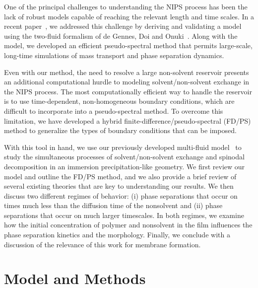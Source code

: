 \documentclass[journal=mamobx, layout=twocolumn]{achemso}
\begin{document}
One of the principal challenges to understanding the NIPS process has been the lack of robust models capable of reaching the relevant length and time scales.
In a recent paper~\cite{Tree2017}, we addressed this challenge by deriving and validating a model using the two-fluid formalism of de Gennes, Doi and Onuki~\cite{DeGennes1980,Doi1992}.
Along with the model, we developed an efficient pseudo-spectral method that permits large-scale, long-time simulations of mass transport and phase separation dynamics.

Even with our method, the need to resolve a large non-solvent reservoir presents an additional computational hurdle to modeling solvent/non-solvent exchange in the NIPS process.
The most computationally efficient way to handle the reservoir is to use time-dependent, non-homogeneous boundary conditions, which are difficult to incorporate into a pseudo-spectral method.
To overcome this limitation, we have developed a hybrid finite-difference/pseudo-spectral (FD/PS) method to generalize the types of boundary conditions that can be imposed.

With this tool in hand, we use our previously developed multi-fluid model~\cite{Tree2017} to study the simultaneous processes of solvent/non-solvent exchange and spinodal decomposition in an immersion precipitation-like geometry.
We first review our model and outline the FD/PS method, and we also provide a brief review of several existing theories that are key to understanding our results.
We then discuss two different regimes of behavior: (i) phase separations that occur on times much less than the diffusion time of the nonsolvent and (ii) phase separations that occur on much larger timescales.
In both regimes, we examine how the initial concentration of polymer and nonsolvent in the film influences the phase separation kinetics and the morphology.
Finally, we conclude with a discussion of the relevance of this work for membrane formation.

\section{Model and Methods}
\end{document}
